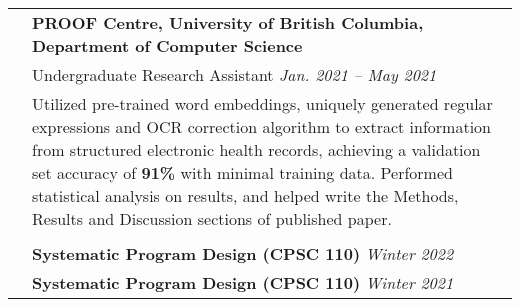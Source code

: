 \documentclass[letterpaper, 11pt]{article}
\begin{document}
\begin{longtable}{p{1.3in}p{4.8in}}
	 & \textbf{PROOF Centre, University of British Columbia, Department of Computer Science}                                                                                                                                                                                                                                                                                                     \\
	 & Undergraduate Research Assistant \hfill \textit{Jan. 2021 -- May 2021}                                                                                                                                                                                                                                                                                                                    \\
	 & Utilized pre-trained word embeddings, uniquely generated regular expressions and OCR correction algorithm to extract information from structured electronic health records, achieving a validation set accuracy of \textbf{91\%} with minimal training data. Performed statistical analysis on results, and helped write the Methods, Results and Discussion sections of published paper. \\
	 &                                                                                                                                                                                                                                                                                                                                                                                           \\

	{\color{Blue}{Teaching Experience}}
	 & \textbf{Systematic Program Design (CPSC 110)} \hfill \textit{Winter 2022}                                                                                                                                                                                                                                                                                                                 \\

	 & \textbf{Systematic Program Design (CPSC 110)} \hfill \textit{Winter 2021}                                                                                                                                                                                                                                                                                                                 \\


\end{longtable}
\end{document}

